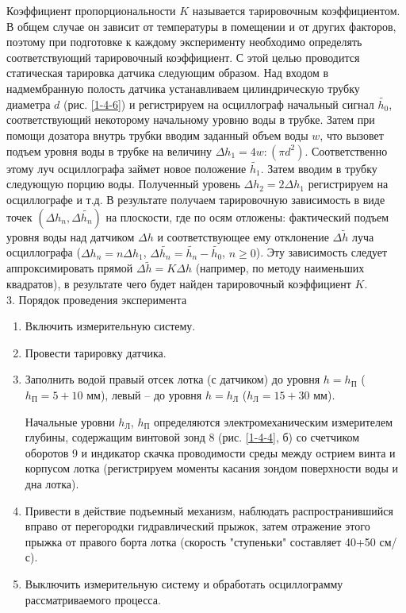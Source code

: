 \documentclass[specialist, subf, href, colorlinks=true, 14pt, final]{disser}
\theoremstyle{definition}
\begin{document}
Коэффициент пропорциональности $K$ называется тарировочным коэффициентом. В общем случае он зависит от температуры в помещении и от других факторов, поэтому при подготовке к каждому эксперименту необходимо определять соответствующий тарировочный коэффициент. С этой целью проводится статическая тарировка датчика следующим образом. Над входом в надмембранную полость датчика устанавливаем цилиндрическую трубку диаметра $d$ (рис. \ref{1-4-6}) и регистрируем на осциллограф начальный сигнал $\widetilde{h_0}$, соответствующий некоторому начальному уровню воды в трубке. Затем при помощи дозатора внутрь трубки вводим заданный объем воды $w$, что вызовет подъем уровня воды в трубке на величину $\Delta h_{1} = 4w:(\pi d^{2})$. Соответственно этому луч осциллографа займет новое положение $\widetilde{h_1}$. Затем вводим в трубку следующую порцию воды. Полученный уровень $\Delta h_{2} = 2\Delta h_{1}$ регистрируем на осциллографе и т.д. В результате получаем тарировочную зависимость в виде точек $(\Delta h_{n}, \Delta \widetilde{h_n})$ на плоскости, где по осям отложены: фактический подъем уровня воды над датчиком $\Delta h$ и соответствующее ему отклонение $\Delta \widetilde{h}$ луча осциллографа ($\Delta h_{n} = n\Delta h_{1}$, $\Delta \widetilde{h_n} = \widetilde{h_n} - \widetilde{h_0}$, $n\geqslant 0$). Эту зависимость следует аппроксимировать прямой $\Delta \widetilde{h} = K\Delta h$ (например, по методу наименьших квадратов), в результате чего будет найден тарировочный коэффициент $K$.\\

3. Порядок проведения эксперимента
\begin{enumerate}
  \item Включить измерительную систему.
  \item Провести тарировку датчика.
  \item Заполнить водой правый отсек лотка (с датчиком) до уровня $h = h_{\text{П}}$ ($h_{\text{П}} = 5+10$ мм), левый -- до уровня $h = h_{\text{Л}}$ ($h_{\text{Л}} = 15+30$ мм).
  
  Начальные уровни $h_{\text{Л}}$, $h_{\text{П}}$ определяются электромеханическим измерителем глубины, содержащим винтовой зонд 8 (рис. \ref{1-4-4}, б) со счетчиком оборотов 9 и индикатор скачка проводимости среды между острием винта и корпусом лотка (регистрируем моменты касания зондом поверхности воды и дна лотка).
  
  \item Привести в действие подъемный механизм, наблюдать распространившийся вправо от перегородки гидравлический прыжок, затем отражение этого прыжка от правого борта лотка (скорость "ступеньки"{} составляет 40+50 см/с).
  \item Выключить измерительную систему и обработать осциллограмму рассматриваемого процесса.
\end{enumerate}
\end{document}
